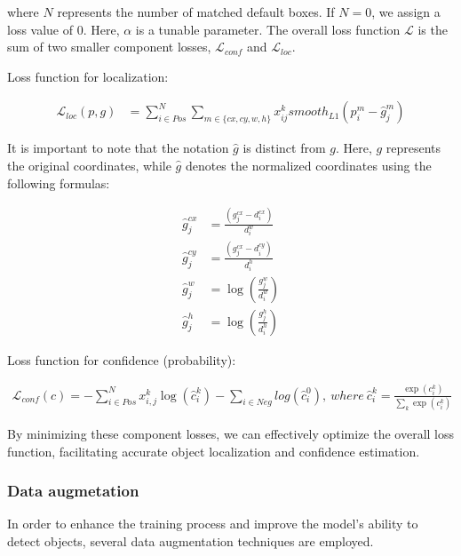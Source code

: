 \documentclass[a4paper]{article}
\begin{document}
where $N$ represents the number of matched default boxes. If $N=0$, we assign a loss value of $0$. Here, $\alpha$ is a tunable parameter. The overall loss function $\mathcal{L}$ is the sum of two smaller component losses, $\mathcal{L}_{conf}$ and $\mathcal{L}_{loc}$.

Loss function for localization:

\begin{align}
	\mathcal{L}_{loc}(p, g) &= \sum_{i \in Pos}^{N} \sum_{m \in \lbrace cx, cy, w, h\rbrace} x_{ij}^{k} smooth_{L1}(p_i^m - \hat{g}_j^m)
\end{align} 

It is important to note that the notation $\hat{g}$ is distinct from $g$. Here, $g$ represents the original coordinates, while $\hat{g}$ denotes the normalized coordinates using the following formulas:

\begin{align}
	\hat{g}_j^{cx} &= \frac{(g_j^{cx} - d_i^{cx})}{d_i^w} \\ 
	\hat{g}_j^{cy} &= \frac{(g_j^{cx} - d_i^{cy})}{d_i^h} \\
	\hat{g}_j^w    &= \log(\frac{g_j^w}{d_i^w}) \\
	\hat{g}_j^h    &= \log(\frac{g_j^h}{d_i^h})
\end{align}

Loss function for confidence (probability):

\begin{align}
	\mathcal{L}_{conf}(c) = - \sum_{i \in Pos}^N x_{i, j}^k \log(\hat{c}_i^k) - \sum_{i \in Neg} log(\hat{c}_i^0), ~ where ~ \hat{c}_i^k = \frac{\exp(c_i^k)}{\sum_{k} \exp(c_i^k)}
\end{align}


By minimizing these component losses, we can effectively optimize the overall loss function, facilitating accurate object localization and confidence estimation.
 	
\subsubsection{Data augmetation}

In order to enhance the training process and improve the model's ability to detect objects, several data augmentation techniques are employed.
\end{document}
